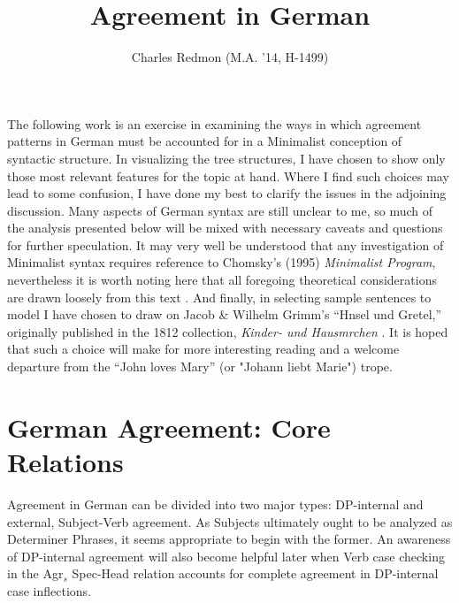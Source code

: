 \documentclass[12pt]{article}
\begin{document}
\title{\Huge Agreement in German}
\author{Charles Redmon (M.A. '14, H-1499)}
\date{}
\maketitle
\begin{flushleft}
The following work is an exercise in examining the ways in which agreement patterns in German must be accounted for in a Minimalist conception of syntactic structure. In visualizing the tree structures, I have chosen to show only those most relevant features for the topic at hand. Where I find such choices may lead to some confusion, I have done my best to clarify the issues in the adjoining discussion. Many aspects of German syntax are still unclear to me, so much of the analysis presented below will be mixed with necessary caveats and questions for further speculation. It may very well be understood that any investigation of Minimalist syntax requires reference to Chomsky's (1995) {\it Minimalist Program}, nevertheless it is worth noting here that all foregoing theoretical considerations are drawn loosely from this text \cite{chomsky}. And finally, in selecting sample sentences to model I have chosen to draw on Jacob \& Wilhelm Grimm's ``Hnsel und Gretel,'' originally published in the 1812 collection, {\it Kinder- und Hausmrchen} \cite{grimm}.  It is hoped that such a choice will make for more interesting reading and a welcome departure from the ``John loves Mary'' (or "Johann liebt Marie") trope. 

\section{German Agreement: Core Relations}
Agreement in German can be divided into two major types: DP-internal and external, Subject-Verb agreement. As Subjects ultimately ought to be analyzed as Determiner Phrases, it seems appropriate to begin with the former. An awareness of DP-internal agreement will also become helpful later when Verb case checking in the Agr$_s$ Spec-Head relation accounts for complete agreement in DP-internal case inflections. 

\end{flushleft}
\end{document}
